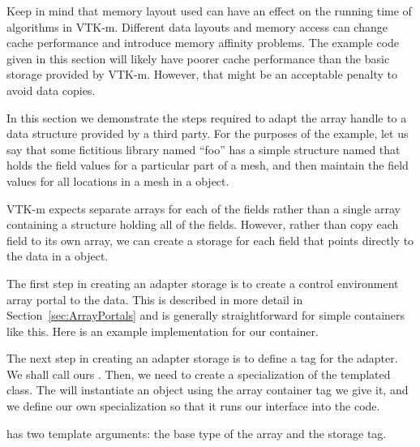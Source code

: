 \begin{commonerrors}
  Keep in mind that memory layout used can have an effect on the running
  time of algorithms in VTK-m. Different data layouts and memory access can
  change cache performance and introduce memory affinity problems. The
  example code given in this section will likely have poorer cache
  performance than the basic storage provided by VTK-m. However, that might
  be an acceptable penalty to avoid data copies.
\end{commonerrors}

In this section we demonstrate the steps required to adapt the array handle
to a data structure provided by a third party. For the purposes of the
example, let us say that some fictitious library named ``foo'' has a simple
structure named  that holds the field values for a
particular part of a mesh, and then maintain the field values for all
locations in a mesh in a  object.


VTK-m expects separate arrays for each of the fields rather than a single
array containing a structure holding all of the fields. However, rather
than copy each field to its own array, we can create a storage for each
field that points directly to the data in a 
object.

The first step in creating an adapter storage is to create a control
environment array portal to the data. This is described in more detail in
Section~\ref{sec:ArrayPortals} and is generally straightforward for simple
containers like this. Here is an example implementation for our
 container.


The next step in creating an adapter storage is to define a tag for the
adapter. We shall call ours
. Then, we need to create a
specialization of the templated 
class. The  will instantiate an object using
the array container tag we give it, and we define our own specialization so
that it runs our interface into the code.

 has two template arguments: the
base type of the array and the storage tag.

